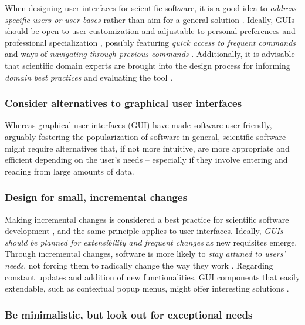 When designing user interfaces for scientific software, it is a good idea to \emph{address specific users or user-bases} rather than aim for a general solution \cite {Javahery:2004, DeRoure:2009}. Ideally, GUIs should be open to user customization and adjustable to personal preferences and professional specialization \cite{Gertz:1994, Javahery:2004}, possibly featuring \emph{quick access to frequent commands} \cite{Julvez:2014} and ways of \emph{navigating through previous commands} \cite{bestprSC}. 
Additionally, it is advisable that scientific domain experts are brought into the design process for informing \emph{domain best practices} \cite{Schraefel:2004,  DeMatos:2013} and evaluating the tool \cite{Keefe:2010}.

\subsubsection{Consider alternatives to graphical user interfaces}

Whereas graphical user interfaces (GUI) have made software user-friendly, arguably fostering the popularization of software in general, scientific software might require alternatives that, if not more intuitive, are more appropriate and efficient depending on the user's needs – especially if they involve entering and reading from large amounts of data. 
 

\subsubsection{Design for small, incremental changes}
Making incremental changes is considered a best practice for scientific software development  \cite{bestprSC}, and the same principle applies to user interfaces. Ideally, \emph{GUIs should be planned for extensibility and frequent changes} as new requisites emerge. Through incremental changes, software is more likely to \emph{stay attuned to users' needs}, not forcing them to radically change the way they work \cite{DeRoure:2009}. Regarding constant updates and addition of new functionalities, GUI components that easily extendable, such as contextual popup menus, might offer interesting solutions \cite{MacLeod:1992}. 

\subsubsection{Be minimalistic, but look out for exceptional needs}

